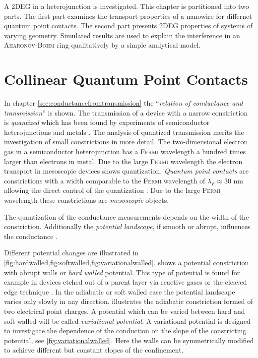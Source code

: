 A 2DEG in a heterojunction is investigated. This chapter is partitioned into two parts. The first part examines the transport properties of a nanowire for differnet quantum point contacts. The second part presents 2DEG properties of systems of varying geometry. Simulated results are used to explain the interference in an \textsc{Aharonov-Bohm} ring qualitatively by a simple analytical model.\par
\section{Collinear Quantum Point Contacts}
In chapter \ref{sec:conductancefromtransmission} the ``\emph{relation of conductance and transmission}'' \cite{landauer1996} is shown. The transmission of a device with a narrow constriction is \emph{quantized} which has been found by experiments of semiconductor heterojunctions \cite{vanHoutenBeenakker2005} and metals \cite{PhysRevB.36.1284}. The analysis of quantized transmission merits the investigation of small constrictions in more detail.
The two-dimensional electron gas in a semiconductor heterojunction has a \textsc{Fermi} wavelength a hundred times larger than electrons in metal. Due to the large \textsc{Fermi} wavelength the electron transport in mesoscopic devices shows quantization. \emph{Quantum point contacts} are constrictions with a width comparable to the \textsc{Fermi} wavelength of $\lambda_F \approx 30\text{~nm}$ allowing the direct control of the quantization \cite{vanHoutenBeenakker2005}. Due to the large \textsc{Fermi} wavelength these constrictions are \emph{mesoscopic} objects.\par
The quantization of the conductance measurements depends on the width of the constriction. Additionally the \emph{potential landscape}, if smooth or abrupt, influences the conductance \cite{PhysRevB.44.8017}.\par
Different potential changes are illustrated in \cref{fig:hardwalled,fig:softwalled,fig:variationalwalled}.  shows a potential constriction with abrupt walls or \emph{hard walled} potential. This type of potential is found for example in devices etched out of a parent layer via reactive gases or the cleaved edge technique \cite{ApplPhysLett.66.323}. In the adiabatic or soft walled case the potential landscape varies only slowly in any direction.  illustrates the adiabatic constriction formed of two electrical point charges. A potential which can be varied between hard and soft walled will be called \emph{variational potential}. A variational potential is designed to investigate the dependence of the conduction on the slope of the constricting potential, see \cref{fig:variationalwalled}. Here the walls can be symmetrically modified to achieve different but constant slopes of the confinement.
